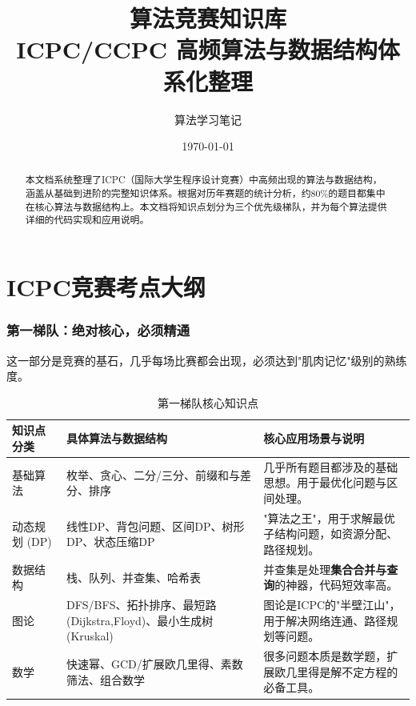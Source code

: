 \documentclass[12pt,a4paper]{ctexart}
\title{\textbf{算法竞赛知识库}\\[5pt]
	\large ICPC/CCPC 高频算法与数据结构体系化整理}
\author{算法学习笔记}
\date{\today}
\begin{document}
	
	\maketitle
	
	\begin{abstract}
		本文档系统整理了ICPC（国际大学生程序设计竞赛）中高频出现的算法与数据结构，涵盖从基础到进阶的完整知识体系。根据对历年赛题的统计分析，约80\%的题目都集中在核心算法与数据结构上。本文档将知识点划分为三个优先级梯队，并为每个算法提供详细的代码实现和应用说明。
	\end{abstract}
	
	\tableofcontents
	\newpage
	
	\part{ICPC竞赛考点大纲}
	
	\section{第一梯队：绝对核心，必须精通}
	这一部分是竞赛的基石，几乎每场比赛都会出现，必须达到"肌肉记忆"级别的熟练度。
	
	\begin{table}[h!]
		\centering
		\caption{第一梯队核心知识点}
		\label{tab:tier1}
		\begin{tabularx}{\textwidth}{|X|X|X|}
			\hline
			\rowcolor{lightgray} \textbf{知识点分类} & \textbf{具体算法与数据结构} & \textbf{核心应用场景与说明} \\ \hline
			基础算法 & 枚举、贪心、二分/三分、前缀和与差分、排序 & 几乎所有题目都涉及的基础思想。用于最优化问题与区间处理。 \\ \hline
			动态规划 (DP) & 线性DP、背包问题、区间DP、树形DP、状态压缩DP & "算法之王"，用于求解最优子结构问题，如资源分配、路径规划。 \\ \hline
			数据结构 & 栈、队列、并查集、哈希表 & 并查集是处理\textbf{集合合并与查询}的神器，代码短效率高。 \\ \hline
			图论 & DFS/BFS、拓扑排序、最短路(Dijkstra,Floyd)、最小生成树(Kruskal) & 图论是ICPC的"半壁江山"，用于解决网络连通、路径规划等问题。 \\ \hline
			数学 & 快速幂、GCD/扩展欧几里得、素数筛法、组合数学 & 很多问题本质是数学题，扩展欧几里得是解不定方程的必备工具。 \\ \hline
		\end{tabularx}
	\end{table}
	
\end{document}
